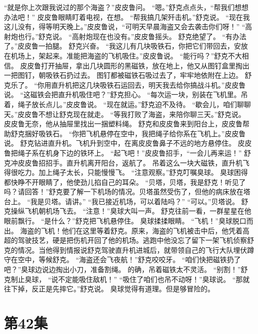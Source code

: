 \documentclass[a4paper,12pt,UTF8,twoside]{ctexbook}
\begin{document}
        “就是你上次跟我说过的那个海盗？”皮皮鲁问。 
        “嗯。”舒克点点头，“帮我们想想办法吧！” 
        皮皮鲁眼睛盯着电视，在想。 
        “帮我搞几架歼击机。”舒克说。 
        “现在我这儿没有，得等明天晚上。”皮皮鲁说，“可明天早晨海盗又会去袭击你们呀！” 
        “高射炮也行。”舒克说。 
        “高射炮现在也没有。”皮皮鲁摇头。 
        舒克绝望了。 
        “有办法了。”皮皮鲁一拍腿。 
        舒克兴奋。 
        “我这儿有几块吸铁石，你把它们带回去，安放在机场上，架起来。准能把海盗的飞机吸住。”皮皮鲁说。 
        “能行吗？”舒克不大相信。 
        皮皮鲁打开抽屉，拿出几块圆形的黑磁铁，放在地上，他又从图钉盒里掏出一把图钉，朝吸铁石扔过去。 
        图钉都被磁铁石吸过去了，牢牢地依附在上边。 
        舒克乐了。 
        “你用直升机把这几块吸铁石运回去，明天我去给你搞战斗机。”皮皮鲁说。 
        “这磁铁会把直升机吸住吧？”舒克担心。 
        “每次运一块，别装在飞机里。吊着，绳子放长点儿。”皮皮鲁说。 
        “现在就运。”舒克迫不及待。 
        “歇会儿，咱们聊聊天。”皮皮鲁不想让舒克现在就走。 
        “等我打败了海盗，来陪你聊三天。”舒克说。 
        皮皮鲁无奈，他从抽屉里找出一捆塑料绳。 
        舒克和皮皮鲁来到阳台上，皮皮鲁帮助舒克捆好吸铁石。 
        “你把飞机悬停在空中，我把绳子给你系在飞机上。”皮皮鲁说。 
        舒克钻进直升机。飞机升到空中，在离皮皮鲁鼻子不远的地方悬停住。 
        皮皮鲁把绳子系在机身下边的铁环上。 
        “起飞吧！”皮皮鲁招手，“一会儿再来运！” 
        舒克冲皮皮鲁招招手。直升机离开阳台，返航了。 
        吊着这么一块大磁铁，直升机飞得很吃力。加上绳子太长，只能慢慢飞。 
        “注意观察。”舒克叮嘱臭球。 
        臭球困得都快睁不开眼睛了，他使劲儿掐自己的耳朵。 
        “贝塔，贝塔，我是舒克！听见了吗？请回答！”舒克要了解一下机场的情况。贝塔虽然受伤了，但他的病床放在塔台上。 
        “我是贝塔。请讲。” 
        “我已接近机场，可以着陆吗？” 
        “可以。”贝塔说。 
        舒克操纵飞机朝机场飞去。 
        “注意！”臭球大叫一声。 
        舒克往前一看，一群星星在他眼前飘行。 
        “是什么？”舒克把飞机悬停住。 
        臭球揉揉眼睛。 
        “飞机！”臭球脱口而出。 
        海盗的飞机！他们在这里等着舒克。原来，海盗的飞机被击中后，他凭着高超的驾驶技艺，硬是把伤机开回了他的机场。逃跑中他没忘了留下一架飞机侦察舒克的情况。当他得到情报说舒克驾驶直升机进城后，就带领自己的飞行大队埋伏蹲守在空中，等候舒克。 
        “海盗还会飞夜航！”舒克咬咬牙。 
        “咱们快把磁铁扔了吧？”臭球边说边掏出小刀，准备割绳。 
        的确，吊着磁铁太不灵活。 
        “别割！”舒克制止臭球，  “说不定能吸住敌机！” 
        “吸住了咱们也吊不动呀！”臭球说。 
        “那就往下掉，反正是先摔它。”舒克说。 
        臭球觉得有道理。但是够冒险的。   \chapter{第42集} 
\end{document}
